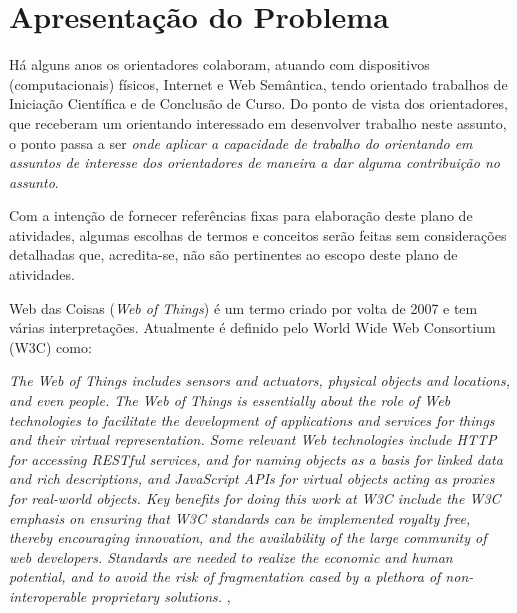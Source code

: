 \chapter{Apresentação do Problema}


Há alguns anos os orientadores colaboram, atuando com dispositivos (computacionais) físicos, Internet e Web Semântica, tendo orientado trabalhos de Iniciação Científica e de Conclusão de Curso. Do ponto de vista dos orientadores, que receberam um orientando interessado em desenvolver trabalho neste assunto, o ponto passa a ser \textit{onde aplicar a capacidade de trabalho do orientando em assuntos de interesse dos orientadores de maneira a dar alguma contribuição no assunto}. 

Com a intenção de fornecer referências fixas para elaboração deste plano de atividades, algumas escolhas de termos e conceitos serão feitas sem considerações detalhadas que, acredita-se, não são pertinentes ao escopo deste plano de atividades.

Web das Coisas (\textit{Web of Things}) é um termo criado por volta de 2007 e tem várias interpretações. Atualmente é definido pelo World Wide Web Consortium (W3C) como:

\textit{The Web of Things includes sensors and actuators, physical objects and locations, and even people. The Web of Things is essentially about the role of Web technologies to facilitate the development of applications and services for things and their virtual representation. Some relevant Web technologies include HTTP for accessing RESTful services, and for naming objects as a basis for linked data and rich descriptions, and JavaScript APIs for virtual objects acting as proxies for real-world objects. Key benefits for doing this work at W3C include the W3C emphasis on ensuring that W3C standards can be implemented royalty free, thereby encouraging innovation, and the availability of the large community of web developers. Standards are needed to realize the economic and human potential, and to avoid the risk of fragmentation cased by a plethora of non-interoperable proprietary solutions.
} \cite{WoTTerminology}, \cite{WoTCommunityWiki}

